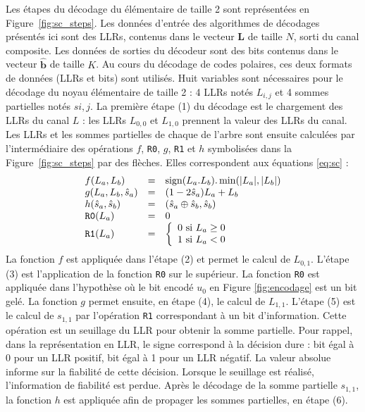 %
Les étapes du décodage du \noeud élémentaire de taille 2 sont représentées en Figure~\ref{fig:sc_steps}.
Les données d'entrée des algorithmes de décodages présentés ici sont des LLRs, contenus dans le vecteur $\mathbold{L}$ de taille $N$, sorti du canal composite.
Les données de sorties du décodeur sont des bits contenus dans le vecteur $\mathbold{\hat{b}}$ de taille $K$.
Au cours du décodage de codes polaires, ces deux formats de données (LLRs et bits) sont utilisés.
Huit variables sont nécessaires pour le décodage du noyau élémentaire de taille 2 : 4 LLRs notés $L_{i,j}$ et 4 sommes partielles notés $s{i,j}$.
La première étape (1) du décodage est le chargement des LLRs du canal $L$ : les LLRs $L_{0,0}$ et $L_{1,0}$ prennent la valeur des LLRs du canal. Les LLRs et les sommes partielles de chaque \noeud de l'arbre sont ensuite calculées par l'intermédiaire des opérations $f$, \texttt{R0}, $g$, \texttt{R1} et $h$ symbolisées dans la Figure~\ref{fig:sc_steps} par des flèches. Elles correspondent aux équations \ref{eq:sc} :
\begin{eqnarray}
  \begin{array}{l c l}
    f(L_a,L_b) &=& \text{sign}(L_a.L_b).\min(|L_a|,|L_b|)\\
    g(L_a,L_b,\hat{s}_a)&=&(1-2\hat{s}_a)L_a+L_b\\
    h(\hat{s}_a,\hat{s}_b)&=& (\hat{s}_{a} \oplus \hat{s}_{b}, \hat{s}_{b})\\
    \texttt{R0}(L_a) &=& 0 \\
    \texttt{R1}(L_a) &=&  \left\{\begin{array}{l c l} 0 \text{ si } L_a \geq 0 \\ 1 \text{ si } L_a < 0 \end{array}\right.
  \end{array}
  \label{eq:sc}
\end{eqnarray}
La fonction $f$ est appliquée dans l'étape (2) et permet le calcul de $L_{0,1}$.
L'étape (3) est l'application de la fonction \texttt{R0} sur le \noeud supérieur. 
La fonction \texttt{R0} est appliquée dans l'hypothèse où le bit encodé $u_0$ en Figure \ref{fig:encodage} est un bit gelé.
La fonction $g$ permet ensuite, en étape (4), le calcul de $L_{1,1}$.
L'étape (5) est le calcul de $s_{1,1}$ par l'opération \texttt{R1} correspondant à un bit d'information. 
Cette opération est un seuillage du LLR pour obtenir la somme partielle.
Pour rappel, dans la représentation en LLR, le signe correspond à la décision dure : bit égal à 0 pour un LLR positif, bit égal à 1 pour un LLR négatif. 
La valeur absolue informe sur la fiabilité de cette décision.
Lorsque le seuillage est réalisé, l'information de fiabilité est perdue.
Après le décodage de la somme partielle $s_{1,1}$, la fonction $h$ est appliquée afin de propager les sommes partielles, en étape (6).


